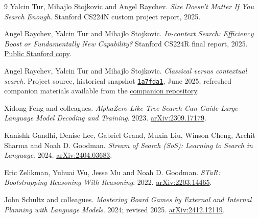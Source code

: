 \documentclass[11pt,letterpaper]{article}
\newcommand{\repo}{\href{https://github.com/RaychevAngel/classical_vs_contextual_search}{companion repository}}
\begin{document}
\begin{thebibliography}{9}
\small
\setlength{\itemsep}{4pt}
Yalcin Tur, Mihajlo Stojkovic and Angel Raychev.
\emph{Size Doesn't Matter If You Search Enough}. Stanford CS224N custom project report, 2025.

Angel Raychev, Yalcin Tur and Mihajlo Stojkovic.
\emph{In-context Search: Efficiency Boost or Fundamentally New Capability?}
Stanford CS224R final report, 2025.
\href{https://cs224r.stanford.edu/spring_2025/projects/pdfs/CS_224R_Final_Report__3_%20%281%29.pdf}{Public Stanford copy}.

Angel Raychev, Yalcin Tur and Mihajlo Stojkovic.
\emph{Classical versus contextual search}. Project source, historical snapshot
\href{https://github.com/RaychevAngel/classical_vs_contextual_search/tree/1a7fda10617d34ccd3a87c825cba71e4429de91a}{\texttt{1a7fda1}}, June 2025; refreshed companion materials available from the \repo{}.

Xidong Feng and colleagues.
\emph{AlphaZero-Like Tree-Search Can Guide Large Language Model Decoding and Training}.
2023. \href{https://arxiv.org/abs/2309.17179}{arXiv:2309.17179}.

Kanishk Gandhi, Denise Lee, Gabriel Grand, Muxin Liu, Winson Cheng, Archit Sharma and Noah D. Goodman.
\emph{Stream of Search (SoS): Learning to Search in Language}.
2024. \href{https://arxiv.org/abs/2404.03683}{arXiv:2404.03683}.

Eric Zelikman, Yuhuai Wu, Jesse Mu and Noah D. Goodman.
\emph{STaR: Bootstrapping Reasoning With Reasoning}.
2022. \href{https://arxiv.org/abs/2203.14465}{arXiv:2203.14465}.

John Schultz and colleagues.
\emph{Mastering Board Games by External and Internal Planning with Language Models}.
2024; revised 2025. \href{https://arxiv.org/abs/2412.12119}{arXiv:2412.12119}.
\end{thebibliography}
\end{document}
